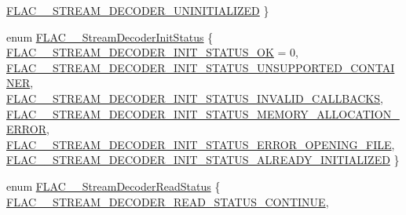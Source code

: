 \begin{DoxyCompactItemize}
\hyperlink{group__flac__stream__decoder_gga3adb6891c5871a87cd5bbae6c770ba2da565eaf4d5e68b440ecec771cb22d3427}{F\+L\+A\+C\+\_\+\+\_\+\+S\+T\+R\+E\+A\+M\+\_\+\+D\+E\+C\+O\+D\+E\+R\+\_\+\+U\+N\+I\+N\+I\+T\+I\+A\+L\+I\+Z\+ED}
 \}
\item 
enum \hyperlink{group__flac__stream__decoder_gaaed54a24ac6310d29c5cafba79759c44}{F\+L\+A\+C\+\_\+\+\_\+\+Stream\+Decoder\+Init\+Status} \{ \newline
\hyperlink{group__flac__stream__decoder_ggaaed54a24ac6310d29c5cafba79759c44ac94c7e9396f30642f34805e5d626e011}{F\+L\+A\+C\+\_\+\+\_\+\+S\+T\+R\+E\+A\+M\+\_\+\+D\+E\+C\+O\+D\+E\+R\+\_\+\+I\+N\+I\+T\+\_\+\+S\+T\+A\+T\+U\+S\+\_\+\+OK} = 0, 
\hyperlink{group__flac__stream__decoder_ggaaed54a24ac6310d29c5cafba79759c44a8f2188c616c9bc09638eece3ae55f152}{F\+L\+A\+C\+\_\+\+\_\+\+S\+T\+R\+E\+A\+M\+\_\+\+D\+E\+C\+O\+D\+E\+R\+\_\+\+I\+N\+I\+T\+\_\+\+S\+T\+A\+T\+U\+S\+\_\+\+U\+N\+S\+U\+P\+P\+O\+R\+T\+E\+D\+\_\+\+C\+O\+N\+T\+A\+I\+N\+ER}, 
\hyperlink{group__flac__stream__decoder_ggaaed54a24ac6310d29c5cafba79759c44a798ad4b6c4e556fd4cb1afbc29562eca}{F\+L\+A\+C\+\_\+\+\_\+\+S\+T\+R\+E\+A\+M\+\_\+\+D\+E\+C\+O\+D\+E\+R\+\_\+\+I\+N\+I\+T\+\_\+\+S\+T\+A\+T\+U\+S\+\_\+\+I\+N\+V\+A\+L\+I\+D\+\_\+\+C\+A\+L\+L\+B\+A\+C\+KS}, 
\hyperlink{group__flac__stream__decoder_ggaaed54a24ac6310d29c5cafba79759c44a0110567f0715c6f87357388bc7fa98f9}{F\+L\+A\+C\+\_\+\+\_\+\+S\+T\+R\+E\+A\+M\+\_\+\+D\+E\+C\+O\+D\+E\+R\+\_\+\+I\+N\+I\+T\+\_\+\+S\+T\+A\+T\+U\+S\+\_\+\+M\+E\+M\+O\+R\+Y\+\_\+\+A\+L\+L\+O\+C\+A\+T\+I\+O\+N\+\_\+\+E\+R\+R\+OR}, 
\newline
\hyperlink{group__flac__stream__decoder_ggaaed54a24ac6310d29c5cafba79759c44a8184c306e0cd2565a8c5adc1381cb469}{F\+L\+A\+C\+\_\+\+\_\+\+S\+T\+R\+E\+A\+M\+\_\+\+D\+E\+C\+O\+D\+E\+R\+\_\+\+I\+N\+I\+T\+\_\+\+S\+T\+A\+T\+U\+S\+\_\+\+E\+R\+R\+O\+R\+\_\+\+O\+P\+E\+N\+I\+N\+G\+\_\+\+F\+I\+LE}, 
\hyperlink{group__flac__stream__decoder_ggaaed54a24ac6310d29c5cafba79759c44a98bc501c9b2fb5d92d8bb0b3321d504f}{F\+L\+A\+C\+\_\+\+\_\+\+S\+T\+R\+E\+A\+M\+\_\+\+D\+E\+C\+O\+D\+E\+R\+\_\+\+I\+N\+I\+T\+\_\+\+S\+T\+A\+T\+U\+S\+\_\+\+A\+L\+R\+E\+A\+D\+Y\+\_\+\+I\+N\+I\+T\+I\+A\+L\+I\+Z\+ED}
 \}
\item 
enum \hyperlink{group__flac__stream__decoder_gad793ead451206c64a91dc0b851027b93}{F\+L\+A\+C\+\_\+\+\_\+\+Stream\+Decoder\+Read\+Status} \{ \hyperlink{group__flac__stream__decoder_ggad793ead451206c64a91dc0b851027b93a9a5be0fcf0279b98b2fd462bc4871d06}{F\+L\+A\+C\+\_\+\+\_\+\+S\+T\+R\+E\+A\+M\+\_\+\+D\+E\+C\+O\+D\+E\+R\+\_\+\+R\+E\+A\+D\+\_\+\+S\+T\+A\+T\+U\+S\+\_\+\+C\+O\+N\+T\+I\+N\+UE}, 

\end{DoxyCompactItemize}
